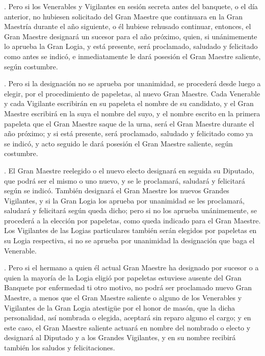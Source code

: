 \documentclass[a4paper,12pt,twoside]{book}
\begin{document}
\vspace{0.3cm}

. Pero si los Venerables y Vigilantes en sesión secreta antes del banquete, o el día anterior, no hubiesen solicitado del Gran Maestre que continuara en la Gran Maestría durante el año siguiente, o él hubiese rehusado continuar, entonces, el Gran Maestre designará un sucesor para el año próximo, quien, si unánimemente lo aprueba la Gran Logia, y está presente, será proclamado, saludado y felicitado como antes se indicó, e inmediatamente le dará posesión el Gran Maestre saliente, según costumbre.

\vspace{0.3cm}

. Pero si la designación no se aprueba por unanimidad, se procederá desde luego a elegir, por el procedimiento de papeletas, al nuevo Gran Maestre. Cada Venerable y cada Vigilante escribirán en su papeleta el nombre de su candidato, y el Gran Maestre escribirá en la suya el nombre del suyo, y el nombre escrito en la primera papeleta que el Gran Maestre saque de la urna, será el Gran Maestre durante el año próximo; y si está presente, será proclamado, saludado y felicitado como ya se indicó, y acto seguido le dará posesión el Gran Maestre saliente, según costumbre.

\vspace{0.3cm}

. El Gran Maestre reelegido o el nuevo electo designará en seguida su Diputado, que podrá ser el mismo o uno nuevo, y se le proclamará, saludará y felicitará según se indicó. También designará el Gran Maestre los nuevos Grandes Vigilantes, y si la Gran Logia los aprueba por unanimidad se les proclamará, saludará y felicitará según queda dicho; pero si no los aprueba unánimemente, se procederá a la elección por papeletas, como queda indicado para el Gran Maestre. Los Vigilantes de las Logias particulares también serán elegidos por papeletas en su Logia respectiva, si no se aprueba por unanimidad la designación que baga el Venerable.

\vspace{0.3cm}

. Pero si el hermano a quien él actual Gran Maestre ha designado por sucesor o a quien la mayoría de la Logia eligió por papeletas estuviese ausente del Gran Banquete por enfermedad ti otro motivo, no podrá ser proclamado nuevo Gran Maestre, a menos que el Gran Maestre saliente o alguno de los Venerables y Vigilantes de la Gran Logia atestigüe por el honor de masón, que la dicha personalidad, así nombrada o elegida, aceptará sin reparo alguno el cargo; y en este caso, el Gran Maestre saliente actuará en nombre del nombrado o electo y designará al Diputado y a los Grandes Vigilantes, y en su nombre recibirá también los saludos y felicitaciones.
\end{document}
